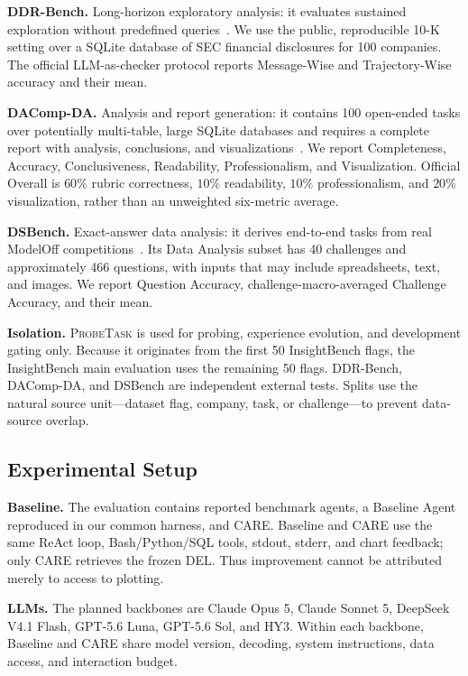 \documentclass{article}
\newcommand{\method}{\textsc{CARE}}
\newcommand{\probe}{\textsc{ProbeTask}}
\begin{document}
\noindent\textbf{DDR-Bench.} Long-horizon exploratory analysis: it evaluates sustained exploration without predefined queries~\citep{liu2026ddrbench}.
We use the public, reproducible 10-K setting over a SQLite database of SEC financial disclosures for 100 companies.
The official LLM-as-checker protocol reports Message-Wise and Trajectory-Wise accuracy and their mean.

\noindent\textbf{DAComp-DA.} Analysis and report generation: it contains 100 open-ended tasks over potentially multi-table, large SQLite databases and requires a complete report with analysis, conclusions, and visualizations~\citep{lei2025dacomp}.
We report Completeness, Accuracy, Conclusiveness, Readability, Professionalism, and Visualization.
Official Overall is $60\%$ rubric correctness, $10\%$ readability, $10\%$ professionalism, and $20\%$ visualization, rather than an unweighted six-metric average.

\noindent\textbf{DSBench.} Exact-answer data analysis: it derives end-to-end tasks from real ModelOff competitions~\citep{jing2024dsbench}.
Its Data Analysis subset has 40 challenges and approximately 466 questions, with inputs that may include spreadsheets, text, and images.
We report Question Accuracy, challenge-macro-averaged Challenge Accuracy, and their mean.

\noindent\textbf{Isolation.} \probe{} is used for probing, experience evolution, and development gating only.
Because it originates from the first 50 InsightBench flags, the InsightBench main evaluation uses the remaining 50 flags.
DDR-Bench, DAComp-DA, and DSBench are independent external tests.
Splits use the natural source unit---dataset flag, company, task, or challenge---to prevent data-source overlap.

\subsection{Experimental Setup}
\label{sec:main-exp-setup}

\noindent\textbf{Baseline.} The evaluation contains reported benchmark agents, a Baseline Agent reproduced in our common harness, and \method{}.
Baseline and \method{} use the same ReAct loop, Bash/Python/SQL tools, stdout, stderr, and chart feedback; only \method{} retrieves the frozen DEL.
Thus improvement cannot be attributed merely to access to plotting.

\noindent\textbf{LLMs.} The planned backbones are Claude Opus 5, Claude Sonnet 5, DeepSeek V4.1 Flash, GPT-5.6 Luna, GPT-5.6 Sol, and HY3.
Within each backbone, Baseline and \method{} share model version, decoding, system instructions, data access, and interaction budget.
\end{document}
